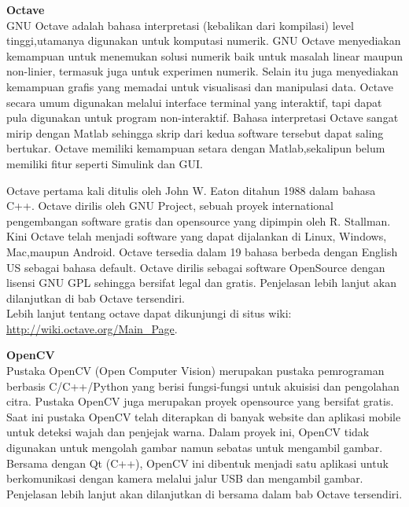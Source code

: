 \documentclass[11pt,fleqn]{book} %
\begin{document}
\begin{flushleft}
 \vspace{5pt}
 \textbf{Octave}\\
 \hspace{10pt} GNU Octave adalah bahasa interpretasi (kebalikan dari kompilasi) level tinggi,utamanya digunakan untuk komputasi numerik. 
 GNU Octave menyediakan kemampuan untuk menemukan solusi numerik baik untuk masalah linear maupun non-linier, termasuk juga untuk experimen numerik. 
 Selain itu juga menyediakan kemampuan grafis yang memadai untuk visualisasi dan manipulasi data. 
 Octave secara umum digunakan melalui interface terminal yang interaktif, tapi dapat pula digunakan untuk program non-interaktif. 
 Bahasa interpretasi Octave sangat mirip dengan Matlab sehingga skrip dari kedua software tersebut dapat saling bertukar.
 Octave memiliki kemampuan setara dengan Matlab,sekalipun belum memiliki fitur seperti Simulink dan GUI.
 
 \hspace{10pt} Octave pertama kali ditulis oleh John W. Eaton ditahun 1988 dalam bahasa C++. 
 Octave dirilis oleh GNU Project, sebuah proyek international pengembangan software gratis dan opensource yang dipimpin oleh R. Stallman. 
 Kini Octave telah menjadi software yang dapat dijalankan di Linux, Windows, Mac,maupun Android. 
 Octave tersedia dalam 19 bahasa berbeda dengan English US sebagai bahasa default. 
 Octave dirilis sebagai software OpenSource dengan lisensi GNU GPL sehingga bersifat legal dan gratis.
 Penjelasan lebih lanjut akan dilanjutkan di bab Octave tersendiri.\\
 
 \hspace{10pt} Lebih lanjut tentang octave dapat dikunjungi di situs wiki: \url{http://wiki.octave.org/Main_Page}.
 
 \vspace{5pt}
 \textbf{OpenCV}\\
 \hspace{10pt} Pustaka OpenCV (Open Computer Vision) merupakan pustaka pemrograman berbasis C/C++/Python yang berisi fungsi-fungsi untuk akuisisi dan pengolahan citra.
  Pustaka OpenCV juga merupakan proyek opensource yang bersifat gratis.
  Saat ini pustaka OpenCV telah diterapkan di banyak website dan aplikasi mobile untuk deteksi wajah dan penjejak warna.
  Dalam proyek ini, OpenCV tidak digunakan untuk mengolah gambar namun sebatas untuk mengambil gambar.
  Bersama dengan Qt (C++), OpenCV ini dibentuk menjadi satu aplikasi untuk berkomunikasi dengan kamera melalui jalur USB dan mengambil gambar.
  Penjelasan lebih lanjut akan dilanjutkan di bersama dalam bab Octave tersendiri.\\
  

\end{flushleft}
\end{document}
